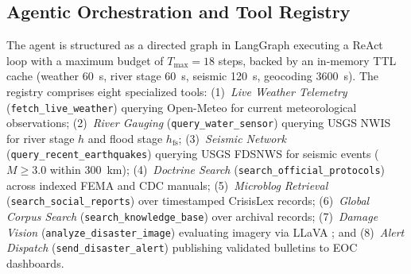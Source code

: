 \documentclass[conference]{IEEEtran}
\begin{document}
\subsection{Agentic Orchestration and Tool Registry}
The agent is structured as a directed graph in LangGraph \cite{langgraph} executing a ReAct loop \cite{react} with a maximum budget of $T_{\max} = 18$ steps, backed by an in-memory TTL cache (weather 60~s, river stage 60~s, seismic 120~s, geocoding 3600~s). The registry comprises eight specialized tools: (1)~\textit{Live Weather Telemetry} (\texttt{fetch\_live\_weather}) querying Open-Meteo for current meteorological observations; (2)~\textit{River Gauging} (\texttt{query\_water\_sensor}) querying USGS NWIS for river stage $h$ and flood stage $h_{\mathrm{fs}}$; (3)~\textit{Seismic Network} (\texttt{query\_recent\_earthquakes}) querying USGS FDSNWS for seismic events ($M \ge 3.0$ within 300~km); (4)~\textit{Doctrine Search} (\texttt{search\_official\_protocols}) across indexed FEMA and CDC manuals; (5)~\textit{Microblog Retrieval} (\texttt{search\_social\_reports}) over timestamped CrisisLex records; (6)~\textit{Global Corpus Search} (\texttt{search\_knowledge\_base}) over archival records; (7)~\textit{Damage Vision} (\texttt{analyze\_disaster\_image}) evaluating imagery via LLaVA \cite{llava}; and (8)~\textit{Alert Dispatch} (\texttt{send\_disaster\_alert}) publishing validated bulletins to EOC dashboards.
\end{document}
